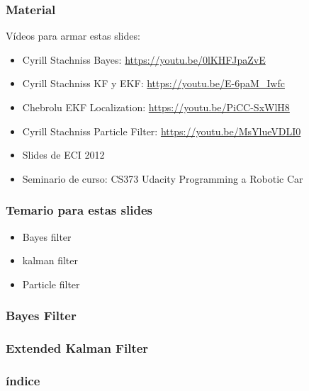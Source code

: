 \begin{frame}
    \frametitle{Material}
    
    Vídeos para armar estas slides:
    \begin{itemize}
        \item Cyrill Stachniss Bayes: \url{https://youtu.be/0lKHFJpaZvE}
        \item Cyrill Stachniss KF y EKF: \url{https://youtu.be/E-6paM_Iwfc}
        \item Chebrolu EKF Localization: \url{https://youtu.be/PiCC-SxWlH8}
        \item Cyrill Stachniss Particle Filter: \url{https://youtu.be/MsYlueVDLI0}
        \item Slides de ECI 2012
        \item Seminario de curso: CS373 Udacity Programming a Robotic Car
    \end{itemize}
    
\end{frame}

\begin{frame}
    \frametitle{Temario para estas slides}
    
    \begin{itemize}
        \item Bayes filter
        \item kalman filter
        \item Particle filter
    \end{itemize}
    
    
\end{frame}

\begin{frame}
    \frametitle{Bayes Filter}
    
   
    
\end{frame}

\begin{frame}
    \frametitle{Extended Kalman Filter}
    
\end{frame}


\begin{frame}
    \frametitle{índice}
    \tableofcontents%
\end{frame}

